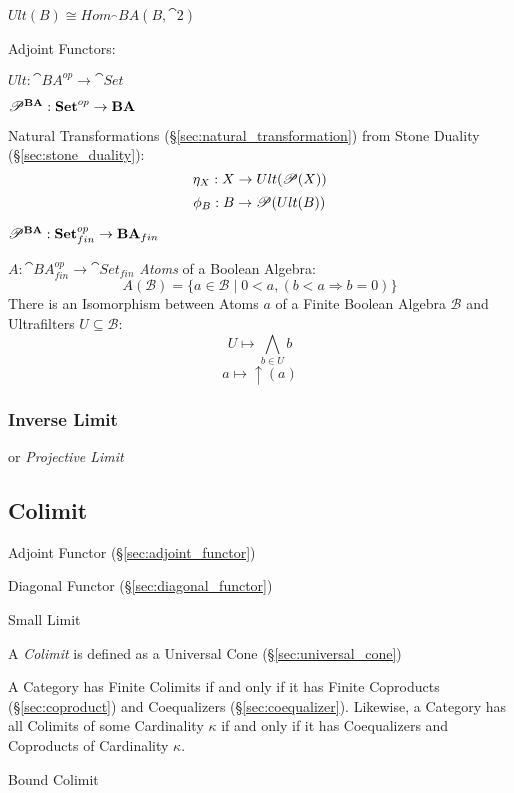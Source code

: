 $Ult(B) \cong Hom_\cat{BA}(B,\cat{2})$

Adjoint Functors:

$Ult : \cat{BA}^{op} \rightarrow \cat{Set}$

$\mathscr{P}^\mathbf{BA} : \mathbf{Set}^{op} \rightarrow \mathbf{BA}$

Natural Transformations (\S\ref{sec:natural_transformation}) from
Stone Duality (\S\ref{sec:stone_duality}):
\[
  \eta_X : X \rightarrow Ult(\mathscr{P}(X))
\]\[
  \phi_B : B \rightarrow \mathscr{P}(Ult(B))
\]

$\mathscr{P}^\mathbf{BA} :
  \mathbf{Set}^{op}_{fin} \rightarrow \mathbf{BA}_{fin}$

$A : \cat{BA}^{op}_{fin} \rightarrow \cat{Set}_{fin}$
\emph{Atoms} of a Boolean Algebra:
\[
  A(\mathcal{B}) = \{ a \in \mathcal{B} \;|\;
    0 < a, (b < a \Rightarrow b = 0) \}
\]
There is an Isomorphism between Atoms $a$ of a Finite Boolean Algebra
$\mathcal{B}$ and Ultrafilters $U \subseteq \mathcal{B}$:
\[
  U \mapsto \bigwedge_{b \in U} b
\]\[
  a \mapsto \uparrow (a)
\]



\subsubsection{Inverse Limit}\label{sec:inverse_limit}

or \emph{Projective Limit}



\subsection{Colimit}\label{sec:colimit}

Adjoint Functor (\S\ref{sec:adjoint_functor})

Diagonal Functor (\S\ref{sec:diagonal_functor})

Small Limit

A \emph{Colimit} is defined as a Universal Cone
(\S\ref{sec:universal_cone})

A Category has Finite Colimits if and only if it has Finite Coproducts
(\S\ref{sec:coproduct}) and Coequalizers (\S\ref{sec:coequalizer}).
Likewise, a Category has all Colimits of some Cardinality $\kappa$ if
and only if it has Coequalizers and Coproducts of Cardinality
$\kappa$.

Bound Colimit %

